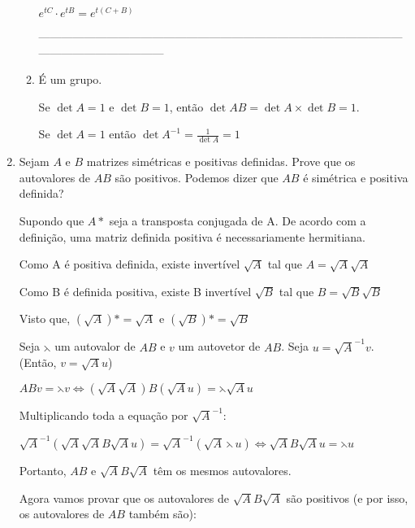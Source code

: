 \documentclass[leqno]{article}
\numberwithin{equation}{section}
\begin{document}
\begin{enumerate}
\begin{sol}
\begin{enumerate}
				$e^{tC} \cdot e^{tB} = e^{t(C + B)}$
				
				---------------------------------------------------------------------------------------------------------------------------------
				\item É um grupo.
				
				Se $\det{A} = 1$ e $\det{B} = 1$, então $\det{AB} = \det{A} \times \det{B} = 1$.
				
				Se $\det{A} = 1$ então $\det{A^{-1}} = \frac{1}{\det{A}} = 1$
			\end{enumerate} 
		\end{sol} 
		
		
		\item Sejam $A$ e $B$ matrizes simétricas e positivas definidas. Prove que os autovalores de $AB$ são positivos. Podemos dizer que $AB$ é simétrica e positiva definida?
		
		\begin{sol} 
			Supondo que $A\ast$ seja a transposta conjugada de A. De acordo com a definição, uma matriz definida positiva é necessariamente hermitiana. 
			
			Como A é positiva definida, existe invertível $\sqrt{A}$ tal que $A = \sqrt{A}\sqrt{A}$
			
			Como B é definida positiva, existe B invertível $\sqrt{B}$ tal que $B = \sqrt{B}\sqrt{B}$
			
			Visto que, $(\sqrt{A})\ast = \sqrt{A}$ e $(\sqrt{B})\ast = \sqrt{B}$
			
			Seja $\leftthreetimes$ um autovalor de $AB$ e $v$ um autovetor de $AB$. Seja $u = \sqrt{A}^{-1}v$. (Então, $v = \sqrt{A}u$)
			
			$ABv = \leftthreetimes v \Longleftrightarrow (\sqrt{A}\sqrt{A})B(\sqrt{A}u) = \leftthreetimes \sqrt{A} u$
			
			Multiplicando toda a equação por $\sqrt{A}^{-1}$:
			
			$ \sqrt{A}^{-1}(\sqrt{A}\sqrt{A}B\sqrt{A}u) = \sqrt{A}^{-1}(\sqrt{A} \leftthreetimes u) \Longleftrightarrow \sqrt{A}B\sqrt{A}u = \leftthreetimes u$
			
			Portanto, $AB$ e $\sqrt{A}B\sqrt{A}$ têm os mesmos autovalores.
			
			Agora vamos provar que os autovalores de $\sqrt{A}B\sqrt{A}$ são positivos (e por isso, os autovalores de $AB$ também são):
			

\end{sol}
\end{enumerate}
\end{document}
